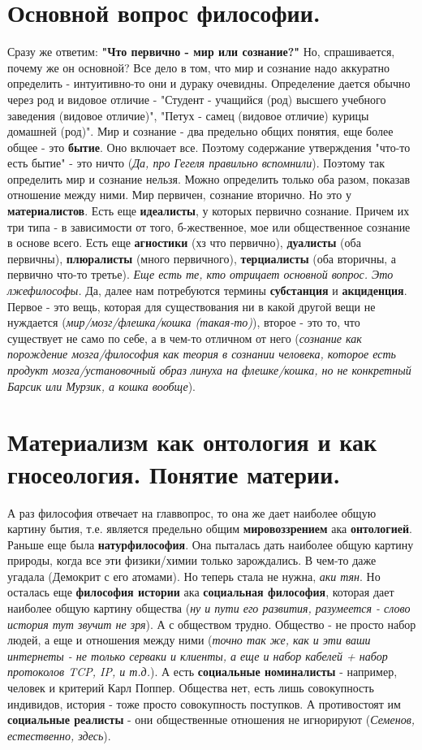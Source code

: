 \section{ Основной вопрос философии.}
Сразу же ответим: \textbf{"Что первично - мир или сознание?"} Но, спрашивается, почему же он основной? Все дело в том, что мир и сознание надо аккуратно определить - интуитивно-то они и дураку очевидны. Определение дается обычно через род и видовое отличие - "Студент - учащийся (род) высшего учебного заведения (видовое отличие)", "Петух - самец (видовое отличие) курицы домашней (род)". Мир и сознание - два предельно общих понятия, еще более общее - это \textbf{бытие}. Оно включает все. Поэтому содержание утверждения "что-то есть бытие" - это ничто (\textit{Да, про Гегеля правильно вспомнили}). Поэтому так определить мир и сознание нельзя. Можно определить только оба разом, показав отношение между ними. Мир первичен, сознание вторично. Но это у \textbf{материалистов}. Есть еще \textbf{идеалисты}, у которых первично сознание. Причем их три типа - в зависимости от того, б-жественное, мое или общественное сознание в основе всего. Есть еще \textbf{агностики} (хз что первично), \textbf{дуалисты} (оба первичны), \textbf{плюралисты} (много первичного), \textbf{терциалисты} (оба вторичны, а первично что-то третье). \textit{Еще есть те, кто отрицает основной вопрос. Это лжефилософы.} Да, далее нам потребуются термины \textbf{субстанция} и \textbf{акциденция}. Первое - это вещь, которая для существования ни в какой другой вещи не нуждается (\textit{мир/мозг/флешка/кошка (такая-то)}), второе - это то, что существует не само по себе, а в чем-то отличном от него (\textit{сознание как порождение мозга/философия как теория в сознании человека, которое есть продукт мозга/установочный образ линуха на флешке/кошка, но не конкретный Барсик или Мурзик, а кошка вообще}).

\section{ Материализм как онтология и как гносеология. Понятие материи.}
А раз философия отвечает на главвопрос, то она же дает наиболее общую картину бытия, т.е. является предельно общим \textbf{мировоззрением} ака \textbf{онтологией}. Раньше еще была \textbf{натурфилософия}. Она пыталась дать наиболее общую картину природы, когда все эти физики/химии только зарождались. В чем-то даже угадала (Демокрит с его атомами). Но теперь стала не нужна, \textit{аки тян}. Но осталась еще \textbf{философия истории} ака \textbf{социальная философия}, которая дает наиболее общую картину общества (\textit{ну и пути его развития, разумеется - слово история тут звучит не зря}). А с обществом трудно. Общество - не просто набор людей, а еще и отношения между ними (\textit{точно так же, как и эти ваши интернеты - не только серваки и клиенты, а еще и набор кабелей + набор протоколов TCP, IP, и т.д.}). А есть \textbf{социальные номиналисты} - например, человек и критерий Карл Поппер. Общества нет, есть лишь совокупность индивидов, история - тоже просто совокупность поступков. А противостоят им \textbf{социальные реалисты} - они общественные отношения не игнорируют (\textit{Семенов, естественно, здесь}).

